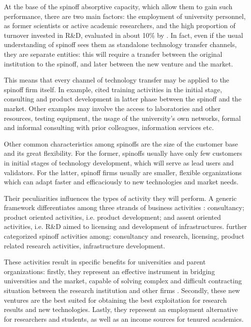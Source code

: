 At the base of the spinoff absorptive capacity, which allow them to gain such performance, there are two main factors: the employment of university personnel, as former scientists or active academic researchers, and the high proportion of turnover invested in R\&D, evaluated in about 10\% by \citet{Perez2003}. In fact, even if the usual understanding of spinoff sees them as standalone technology transfer channels, they are separate entities: this will require a transfer between the original institution to the spinoff, and later between the new venture and the market. 

This means that every channel of technology transfer may be applied to the spinoff firm itself. In example, \citet{Perez2003} cited training activities in the initial stage, consulting and product development in latter phase between the spinoff and the market. Other examples may involve the access to laboratories and other resources, testing equipment, the usage of the university's own networks, formal and informal consulting with prior colleagues, information services etc.

Other common characteristics among spinoffs are the size of the customer base and its great flexibility. For the former, spinoffs usually have only few customers in initial stages of technology development, which will serve as lead users and validators. For the latter, spinoff firms usually are smaller, flexible organizations which can adapt faster and efficaciously to new technologies and market needs. 

Their peculiarities influences the types of activity they will perform. A generic framework differentiates among three strands of business activities \citep{Mustar2006}: consultancy; product oriented activities, i.e. product development; and assent oriented activities, i.e. R\&D aimed to licensing and development of infrastructures. \citet{Druilhe2004} further categorized spinoff activities among: consultancy and research, licensing, product related research activities, infrastructure development. 

These activities result in specific benefits for universities and parent organizations: firstly, they represent an effective instrument in bridging universities and the market, capable of solving complex and difficult contracting situation between the research institution and other firms \citep{Rizzo2015}. Secondly, these new ventures are the best suited for obtaining the best exploitation for research results and new technologies. Lastly, they represent an employment alternative for researchers and students, as well as an income sources for tenured academics.

